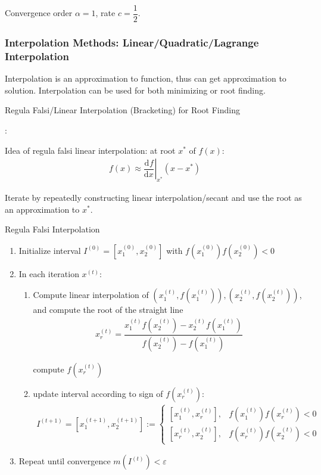     Convergence order $ \alpha =1 $, rate $ c=\dfrac{1}{2} $.


\subsubsection{Interpolation Methods: Linear/Quadratic/Lagrange Interpolation}
    \hypertarget{Interpolation}{Interpolation} is an approximation to function, thus can get approximation to solution. Interpolation can be used for both minimizing or root finding.

\begin{point}
    \hypertarget{RegulaFalsi}{Regula Falsi/Linear Interpolation (Bracketing) for Root Finding}: 
\end{point}
    
    Idea of regula falsi linear interpolation: at root $ x^* $ of $ f(x) $:
    \begin{align}
        f(x) \approx\left. \dfrac{\mathrm{d}^{} f}{\mathrm{d}x^{}}\right|_{x^*}(x-x^*)
    \end{align}
    
    Iterate by repeatedly constructing linear interpolation/secant and use the root as an approximation to $ x^* $.

\begin{algorithm}{Regula Falsi Interpolation}
    \begin{enumerate}[topsep=2pt,itemsep=2pt]
        \item Initialize interval $ I^{(0)}=[x_1^{(0)},x_2^{(0)}] $ with $ f(x_1^{(0)})f(x_2^{(0)})<0 $
        \item In each iteration $ x^{(t)} $:
        \begin{enumerate}[topsep=2pt,itemsep=2pt]
            \item Compute linear interpolation of $ (x_1^{(t)},f(x_1^{(t)})),(x_2^{(t)},f(x_2^{(t)})) $, and compute the root of the straight line
            \begin{align}
                x_r^{(t)}=\dfrac{x_1^{(t)}f(x_2^{(t)})-x_2^{(t)}f(x_1^{(t)})}{f(x_2^{(t)})-f(x_1^{(t)})}
            \end{align}
        
            compute $ f(x_r^{(t)}) $
            \item update interval according to sign of $ f(x_r^{(t)}) $:
            \begin{align}
                I^{(t+1)}=[x_1^{(t+1)},x_2^{(t+1)}]:=\begin{cases}
                    [x_1^{(t)},x_r^{(t)}],& f(x_1^{(t)})f(x_r^{(t)})<0\\
                    [x_r^{(t)},x_2^{(t)}],& f(x_r^{(t)})f(x_2^{(t)})<0
                \end{cases} 
            \end{align}
        \end{enumerate}
        \item Repeat until convergence $ m(I^{(t)})<\varepsilon  $
    \end{enumerate}
\end{algorithm}
    



